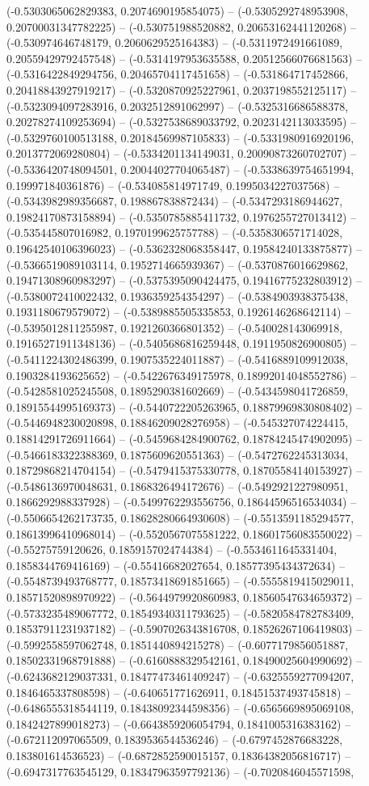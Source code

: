 (-0.5303065062829383, 0.2074690195854075) -- (-0.5305292748953908, 0.20700031347782225) -- (-0.530751988520882, 0.20653162441120268) -- (-0.530974646748179, 0.2060629525164383) -- (-0.5311972491661089, 0.20559429792457548) -- (-0.5314197953635588, 0.20512566076681563) -- (-0.5316422849294756, 0.20465704117451658) -- (-0.531864717452866, 0.20418843927919217) -- (-0.5320870925227961, 0.2037198552125117) -- (-0.5323094097283916, 0.2032512891062997) -- (-0.5325316686588378, 0.20278274109253694) -- (-0.5327538689033792, 0.2023142113033595) -- (-0.5329760100513188, 0.20184569987105833) -- (-0.5331980916920196, 0.2013772069280804) -- (-0.5334201134149031, 0.20090873260702707) -- (-0.5336420748094501, 0.20044027704065487) -- (-0.5338639754651994, 0.199971840361876) -- (-0.534085814971749, 0.1995034227037568) -- (-0.5343982989356687, 0.198867838872434) -- (-0.5347293186944627, 0.19824170873158894) -- (-0.5350785885411732, 0.1976255727013412) -- (-0.535445807016982, 0.1970199625757788) -- (-0.5358306571714028, 0.19642540106396023) -- (-0.5362328068358447, 0.19584240133875877) -- (-0.5366519089103114, 0.1952714665939367) -- (-0.5370876016629862, 0.19471308960983297) -- (-0.5375395090424475, 0.19416775232803912) -- (-0.5380072410022432, 0.1936359254354297) -- (-0.5384903938375438, 0.1931180679579072) -- (-0.5389885505335853, 0.1926146268642114) -- (-0.5395012811255987, 0.1921260366801352) -- (-0.540028143069918, 0.19165271911348136) -- (-0.5405686816259448, 0.1911950826900805) -- (-0.5411224302486399, 0.1907535224011887) -- (-0.5416889109912038, 0.1903284193625652) -- (-0.5422676349175978, 0.18992014048552786) -- (-0.5428581025245508, 0.1895290381602669) -- (-0.5434598041726859, 0.18915544995169373) -- (-0.5440722205263965, 0.18879969830808402) -- (-0.5446948230020898, 0.18846209028276958) -- (-0.545327074224415, 0.18814291726911664) -- (-0.5459684284900762, 0.18784245474902095) -- (-0.5466183322388369, 0.1875609620551363) -- (-0.5472762245313034, 0.18729868214704154) -- (-0.5479415375330778, 0.18705584140153927) -- (-0.5486136970048631, 0.1868326494172676) -- (-0.5492921227980951, 0.1866292988337928) -- (-0.5499762293556756, 0.18644596516534034) -- (-0.5506654262173735, 0.18628280664930608) -- (-0.5513591185294577, 0.18613996410968014) -- (-0.5520567075581222, 0.18601756083550022) -- (-0.55275759120626, 0.1859157024744384) -- (-0.5534611645331404, 0.1858344769416169) -- (-0.55416682027654, 0.18577395434372634) -- (-0.5548739493768777, 0.18573418691851665) -- (-0.5555819415029011, 0.18571520898970922) -- (-0.5644979920860983, 0.18560547634659372) -- (-0.5733235489067772, 0.18549340311793625) -- (-0.5820584782783409, 0.18537911231937182) -- (-0.5907026343816708, 0.18526267106419803) -- (-0.5992558597062748, 0.1851440894215278) -- (-0.6077179856051887, 0.18502331968791888) -- (-0.6160888329542161, 0.18490025604990692) -- (-0.6243682129037331, 0.18477473461409247) -- (-0.6325559277094207, 0.1846465337808598) -- (-0.640651771626911, 0.18451537493745818) -- (-0.6486555318544119, 0.18438092344598356) -- (-0.6565669895069108, 0.1842427899018273) -- (-0.6643859206054794, 0.1841005316383162) -- (-0.672112097065509, 0.1839536544536246) -- (-0.6797452876683228, 0.183801614536523) -- (-0.6872852590015157, 0.18364382056816717) -- (-0.6947317763545129, 0.18347963597792136) -- (-0.7020846045571598, 